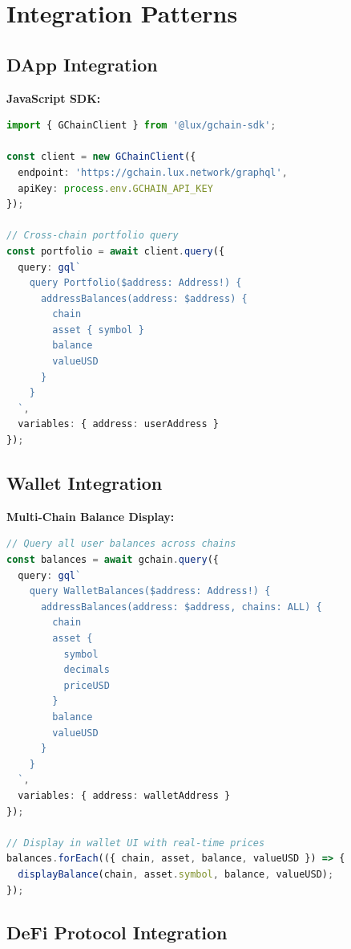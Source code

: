 \documentclass[11pt,a4paper]{article}
\begin{document}
\section{Integration Patterns}

\subsection{DApp Integration}

\textbf{JavaScript SDK:}
\begin{lstlisting}[language=TypeScript, basicstyle=\small\ttfamily]
import { GChainClient } from '@lux/gchain-sdk';

const client = new GChainClient({
  endpoint: 'https://gchain.lux.network/graphql',
  apiKey: process.env.GCHAIN_API_KEY
});

// Cross-chain portfolio query
const portfolio = await client.query({
  query: gql`
    query Portfolio($address: Address!) {
      addressBalances(address: $address) {
        chain
        asset { symbol }
        balance
        valueUSD
      }
    }
  `,
  variables: { address: userAddress }
});
\end{lstlisting}

\subsection{Wallet Integration}

\textbf{Multi-Chain Balance Display:}
\begin{lstlisting}[language=TypeScript, basicstyle=\small\ttfamily]
// Query all user balances across chains
const balances = await gchain.query({
  query: gql`
    query WalletBalances($address: Address!) {
      addressBalances(address: $address, chains: ALL) {
        chain
        asset {
          symbol
          decimals
          priceUSD
        }
        balance
        valueUSD
      }
    }
  `,
  variables: { address: walletAddress }
});

// Display in wallet UI with real-time prices
balances.forEach(({ chain, asset, balance, valueUSD }) => {
  displayBalance(chain, asset.symbol, balance, valueUSD);
});
\end{lstlisting}

\subsection{DeFi Protocol Integration}
\end{document}
